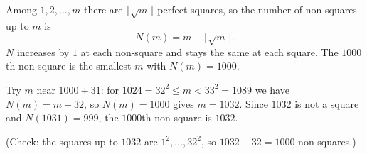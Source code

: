 Among $1,2,\dots,m$ there are $\lfloor\sqrt m\rfloor$ perfect squares, so the number of non-squares up to $m$ is
\[
N(m)=m-\lfloor\sqrt m\rfloor .
\]
$N$ increases by $1$ at each non-square and stays the same at each square. The $1000$th non-square is the smallest $m$ with $N(m)=1000$.

Try $m$ near $1000+31$: for $1024=32^2\le m<33^2=1089$ we have $N(m)=m-32$, so $N(m)=1000$ gives $m=1032$. Since $1032$ is not a square and $N(1031)=999$, the $1000$th non-square is $\boxed{1032}$.

(Check: the squares up to $1032$ are $1^2,\dots,32^2$, so $1032-32=1000$ non-squares.)
